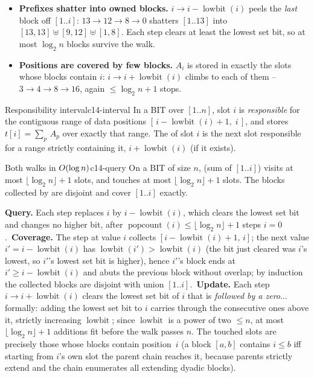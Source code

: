 \begin{itemize}[nosep,leftmargin=1.4em]
  \item \textbf{Prefixes shatter into owned blocks.}  \(i\to
        i-\operatorname{lowbit}(i)\) peels the \emph{last} block off
        \([1..i]\): \(13\to12\to8\to0\) shatters \([1..13]\) into
        \([13,13]\uplus[9,12]\uplus[1,8]\).  Each step clears at least the
        lowest set bit, so at most \(\log_2 n\) blocks survive the walk.
  \item \textbf{Positions are covered by few blocks.}  \(A_i\) is stored in
        exactly the slots whose blocks contain \(i\): \(i\to
        i+\operatorname{lowbit}(i)\) climbs to each of them --
        \(3\to4\to8\to16\), again \(\le\log_2 n+1\) stops.
\end{itemize}

\begin{definition}{Responsibility interval}{c14-interval}
In a BIT over \([1..n]\), slot \(i\) is \emph{responsible} for the contiguous
range of data positions \([\,i-\operatorname{lowbit}(i)+1,\;i\,]\), and stores
\(t[i]=\sum_{p}\,A_p\) over exactly that range.  The  of slot
\(i\) is the next slot responsible for a range strictly containing it,
\(i+\operatorname{lowbit}(i)\) (if it exists).
\end{definition}

\begin{theorem}{Both walks in \(O(\log n)\)}{c14-query}
On a BIT of size \(n\),  (sum of \([1..i]\)) visits at most
\(\lfloor\log_2 n\rfloor+1\) slots, and  touches at
most \(\lfloor\log_2 n\rfloor+1\) slots.  The blocks collected by
 are disjoint and cover \([1..i]\) exactly.
\end{theorem}
\begin{proofbox}
\textbf{Query.}  Each step replaces \(i\) by \(i-\operatorname{lowbit}(i)\),
which clears the lowest set bit and changes no higher bit, after
\(\operatorname{popcount}(i)\le\lfloor\log_2 n\rfloor+1\) steps
\(i=0\).\ \textbf{Coverage.}  The step at value \(i\) collects
\([i{-}\operatorname{lowbit}(i){+}1,\,i]\); the next value
\(i' = i-\operatorname{lowbit}(i)\) has
\(\operatorname{lowbit}(i')>\operatorname{lowbit}(i)\) (the bit just cleared
was \(i\)'s lowest, so \(i'\)'s lowest set bit is higher), hence
\(i'\)'s block ends at \(i'\ge i-\operatorname{lowbit}(i)\) and abuts the
previous block without overlap; by induction the collected blocks are
disjoint with union \([1..i]\).\ \textbf{Update.}  Each step
\(i\to i+\operatorname{lowbit}(i)\) clears the lowest set bit of \(i\) that
is \emph{followed by a zero}... formally: adding the lowest set bit to \(i\)
carries through the consecutive ones above it, strictly increasing
\(\operatorname{lowbit}\); since \(\operatorname{lowbit}\) is a power of two
\(\le n\), at most \(\lfloor\log_2 n\rfloor+1\) additions fit before the walk
passes \(n\).  The touched slots are precisely those whose blocks contain
position~\(i\) (a block \([a,b]\) contains \(i\le b\) iff starting from
\(i\)'s own slot the parent chain reaches it, because parents strictly
extend and the chain enumerates all extending dyadic blocks).
\end{proofbox}

